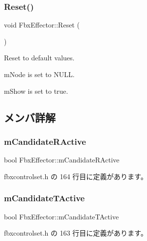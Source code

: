 \subsubsection{\texorpdfstring{Reset()}{Reset()}}
{\footnotesize\ttfamily void Fbx\+Effector\+::\+Reset (\begin{DoxyParamCaption}{ }\end{DoxyParamCaption})}

Reset to default values.
\begin{DoxyItemize}
\item m\+Node is set to N\+U\+LL.
\item m\+Show is set to true. 
\end{DoxyItemize}

\subsection{メンバ詳解}
\mbox{\label{class_fbx_effector_a12e10ffdcf48e38d2893623696ce188d}} 
\subsubsection{\texorpdfstring{m\+Candidate\+R\+Active}{mCandidateRActive}}
{\footnotesize\ttfamily bool Fbx\+Effector\+::m\+Candidate\+R\+Active}



 fbxcontrolset.\+h の 164 行目に定義があります。

\mbox{\label{class_fbx_effector_a624821039f6696c381004a85d2fdc237}} 
\subsubsection{\texorpdfstring{m\+Candidate\+T\+Active}{mCandidateTActive}}
{\footnotesize\ttfamily bool Fbx\+Effector\+::m\+Candidate\+T\+Active}



 fbxcontrolset.\+h の 163 行目に定義があります。

\mbox{\label{class_fbx_effector_ab039944d84107c7d17eef8b6915853f0}} 
